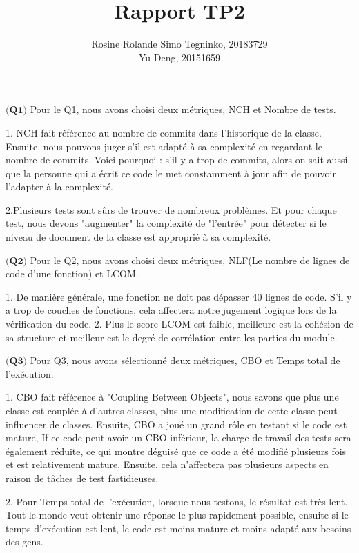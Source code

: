 \documentclass{article}
\title{Rapport TP2}
\author{Rosine Rolande Simo Tegninko, 20183729\\
Yu Deng, 20151659}
\date{}
\begin{document}
\maketitle

\item {}

\item$\textbf{(Q1)}$
Pour le Q1, nous avons choisi deux métriques, NCH et Nombre de tests.

1.	NCH fait référence au nombre de commits dans l'historique de la classe. Ensuite, nous pouvons juger s'il est adapté à sa complexité en regardant le nombre de commits. Voici pourquoi : s'il y a trop de commits, alors on sait aussi que la personne qui a écrit ce code le met constamment à jour afin de pouvoir l'adapter à la complexité.

2.Plusieurs tests sont sûrs de trouver de nombreux problèmes. Et pour chaque test, nous devons "augmenter" la complexité de "l'entrée" pour détecter si le niveau de document de la classe est approprié à sa complexité.


\item $\textbf{(Q2)}$
Pour le Q2, nous avons choisi deux métriques, NLF(Le nombre de lignes de code d’une fonction) et LCOM.

1. De manière générale, une fonction ne doit pas dépasser 40 lignes de code. S'il y a trop de couches de fonctions, cela affectera notre jugement logique lors de la vérification du code.
2. Plus le score LCOM est faible, meilleure est la cohésion de sa structure et meilleur est le degré de corrélation entre les parties du module.


\item$\textbf{(Q3)}$
Pour Q3, nous avons sélectionné deux métriques, CBO et Temps total de l’exécution.


1. CBO fait référence à "Coupling Between Objects", nous savons que plus une classe est couplée à d'autres classes, plus une modification de cette classe peut influencer de classes. Ensuite, CBO a joué un grand rôle en testant si le code est mature, If ce code peut avoir un CBO inférieur, la charge de travail des tests sera également réduite, ce qui montre déguisé que ce code a été modifié plusieurs fois et est relativement mature. Ensuite, cela n'affectera pas plusieurs aspects en raison de tâches de test fastidieuses.

2. Pour Temps total de l’exécution, lorsque nous testons, le résultat est très lent. Tout le monde veut obtenir une réponse le plus rapidement possible, ensuite si le temps d'exécution est lent, le code est moins mature et moins adapté aux besoins des gens.
\end{document}
